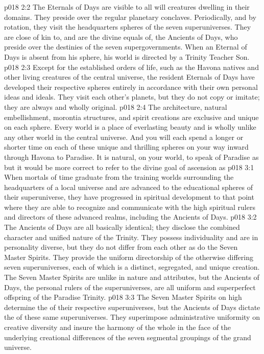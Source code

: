 \vs p018 2:2 The Eternals of Days are visible to all will creatures dwelling in their domains. They preside over the regular planetary conclaves. Periodically, and by rotation, they visit the headquarters spheres of the seven superuniverses. They are close of kin to, and are the divine equals of, the Ancients of Days, who preside over the destinies of the seven supergovernments. When an Eternal of Days is absent from his sphere, his world is directed by a Trinity Teacher Son.\plusone
\vs p018 2:3 Except for the established orders of life, such as the Havona natives and other living creatures of the central universe, the resident Eternals of Days have developed their respective spheres entirely in accordance with their own personal ideas and ideals. They visit each other’s planets, but they do not copy or imitate; they are always and wholly original.
\vs p018 2:4 The architecture, natural embellishment, morontia structures, and spirit creations are exclusive and unique on each sphere. Every world is a place of everlasting beauty and is wholly unlike any other world in the central universe. And you will each spend a longer or shorter time on each of these unique and thrilling spheres on your way inward through Havona to Paradise. It is natural, on your world, to speak of Paradise as  but it would be more correct to refer to the divine goal of ascension as 
\vs p018 3:1 When mortals of time graduate from the training worlds surrounding the headquarters of a local universe and are advanced to the educational spheres of their superuniverse, they have progressed in spiritual development to that point where they are able to recognize and communicate with the high spiritual rulers and directors of these advanced realms, including the Ancients of Days.
\vs p018 3:2 The Ancients of Days are all basically identical; they disclose the combined character and unified nature of the Trinity. They possess individuality and are in personality diverse, but they do not differ from each other as do the Seven Master Spirits. They provide the uniform directorship of the otherwise differing seven superuniverses, each of which is a distinct, segregated, and unique creation. The Seven Master Spirits are unlike in nature and attributes, but the Ancients of Days, the personal rulers of the superuniverses, are all uniform and superperfect offspring of the Paradise Trinity.
\vs p018 3:3 The Seven Master Spirits on high determine the  of their respective superuniverses, but the Ancients of Days dictate the  of these same superuniverses. They superimpose administrative uniformity on creative diversity and insure the harmony of the whole in the face of the underlying creational differences of the seven segmental groupings of the grand universe.
